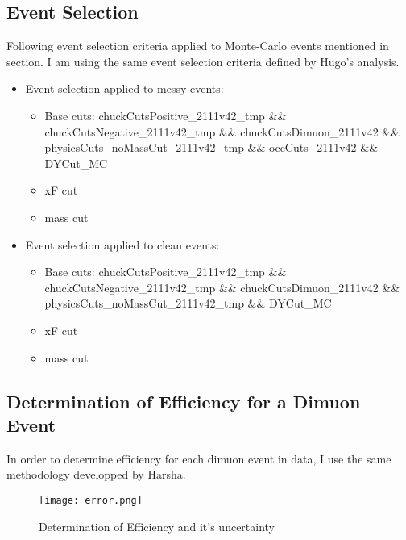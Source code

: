 \documentclass[11pt]{article}
\begin{document}
\subsection{Event Selection}
Following event selection criteria applied to Monte-Carlo events mentioned in section. I am using the same event selection criteria defined by Hugo's analysis.
\begin{itemize}
 \item Event selection applied to messy events:
  \begin{itemize}
   \item Base cuts: chuckCutsPositive\_2111v42\_tmp \&\& chuckCutsNegative\_2111v42\_tmp \&\& chuckCutsDimuon\_2111v42 \&\& physicsCuts\_noMassCut\_2111v42\_tmp \&\& occCuts\_2111v42 \&\& DYCut\_MC
   \item xF cut
   \item mass cut
  \end{itemize}
 \item Event selection applied to clean events:
  \begin{itemize}
   \item Base cuts: chuckCutsPositive\_2111v42\_tmp \&\& chuckCutsNegative\_2111v42\_tmp \&\& chuckCutsDimuon\_2111v42 \&\& physicsCuts\_noMassCut\_2111v42\_tmp \&\& DYCut\_MC
   \item xF cut
   \item mass cut
  \end{itemize}

\end{itemize}

\subsection{Determination of Efficiency for a Dimuon Event}
In order to determine efficiency for each dimuon event in data, I use the same methodology developped by Harsha.

\begin{figure}[h!]
    \centering
    \texttt{[image: error.png]} %
    \caption{Determination of Efficiency and it's uncertainty}
    \label{fig:error_propagation_concept}
\end{figure}
\end{document}
